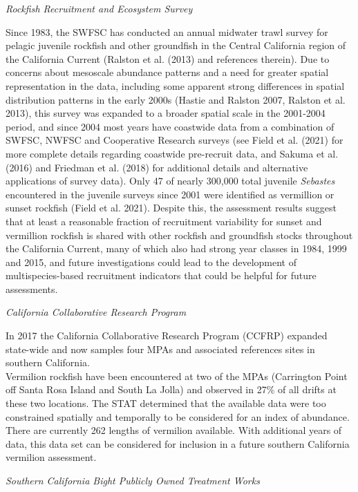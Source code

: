 \documentclass[
  english,
  a4paper,
]{article}
\begin{document}
\emph{Rockfish Recruitment and Ecosystem Survey}

Since 1983, the SWFSC has conducted an annual midwater trawl survey for pelagic
juvenile rockfish and other groundfish in the Central California region of the
California Current (Ralston et al. (2013) and references therein). Due to concerns
about mesoscale abundance patterns and a need for greater spatial representation
in the data, including some apparent strong differences in spatial distribution
patterns in the early 2000s (Hastie and Ralston 2007, Ralston et al. 2013), this survey was expanded
to a broader spatial scale in the 2001-2004 period, and since 2004 most years have
coastwide data from a combination of SWFSC, NWFSC and Cooperative Research surveys
(see Field et al. (2021) for more complete details regarding coastwide
pre-recruit data, and Sakuma et al. (2016) and Friedman et al. (2018)
for additional details and alternative applications of survey data). Only 47 of nearly 300,000 total juvenile \emph{Sebastes} encountered in the juvenile surveys since 2001 were identified as vermillion or sunset rockfish (Field et al. 2021). Despite this, the assessment results suggest that at least a reasonable fraction of recruitment variability for sunset and vermillion rockfish is shared with other rockfish and groundfish stocks throughout the California Current, many of which also had strong year classes in 1984, 1999 and 2015, and future investigations could lead to the development of multispecies-based recruitment indicators that could be helpful for future assessments.

\emph{California Collaborative Research Program}

In 2017 the California Collaborative Research Program (CCFRP) expanded state-wide
and now samples four MPAs and associated references sites in southern California.\\
Vermilion rockfish have been encountered at two of the MPAs (Carrington Point off
Santa Rosa Island and South La Jolla) and observed in 27\% of all drifts at these
two locations. The STAT determined that the available data were too constrained spatially and temporally to be considered for an index of abundance. There are currently 262 lengths of vermilion available. With additional years of data, this data set can be considered for inclusion in a
future southern California vermilion assessment.

\emph{Southern California Bight Publicly Owned Treatment Works}
\end{document}
